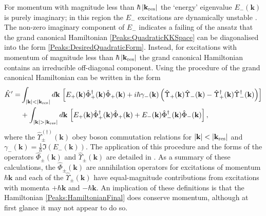 For momentum with magnitude less than $\hbar \left|\mathbf{k}_\text{res}\right|$ the `energy' eigenvalue $E_-(\mathbf{k})$ is purely imaginary; in this region the $E_-$ excitations are dynamically unstable \citep{Leonhardt:2003}. The non-zero imaginary component of $E_-$ indicates a failing of the ansatz that the grand canonical Hamiltonian \eqref{Peaks:QuadraticKKSpace} can be diagonalised into the form \eqref{Peaks:DesiredQuadraticForm}. Instead, for excitations with momentum of magnitude less than $\hbar\left|\mathbf{k}_\text{res}\right|$ the grand canonical Hamiltonian contains an irreducible off-diagonal component. Using the procedure of \citep{Leonhardt:2003} the grand canonical Hamiltonian can be written in the form
\begin{align}
    \begin{split}
        \hat{K}' =& \int_{\abs{\mathbf{k}}<\abs{\mathbf{k}_\text{res}}} d\mathbf{k}\, \left[ E_+(\mathbf{k}) \hat{\Phi}_+^\dagger(\mathbf{k})\hat{\Phi}_+(\mathbf{k}) + i \hbar \gamma_-(\mathbf{k}) \left( \hat{\Upsilon}_+(\mathbf{k}) \hat{\Upsilon}_-(\mathbf{k}) - \hat{\Upsilon}_+^\dagger(\mathbf{k}) \hat{\Upsilon}_-^\dagger(\mathbf{k})\right)\right] \\
        & + \int_{\abs{\mathbf{k}}>\abs{\mathbf{k}_\text{res}}} d\mathbf{k}\, \left[ E_+(\mathbf{k}) \hat{\Phi}_+^\dagger(\mathbf{k})\hat{\Phi}_+(\mathbf{k}) + E_-(\mathbf{k}) \hat{\Phi}_-^\dagger(\mathbf{k}) \hat{\Phi}_-(\mathbf{k})\right],
    \end{split}
    \label{Peaks:HamiltonianFinal}
\end{align}
where the $\hat{\Upsilon}_\pm^{(\dagger)}(\mathbf{k})$ obey boson commutation relations for $\left|\mathbf{k}\right| < \left|\mathbf{k}_\text{res}\right|$ and $\gamma_-(\mathbf{k}) = \frac{1}{\hbar}\Im(E_-(\mathbf{k}))$. The application of this procedure and the forms of the operators $\hat{\Phi}_\pm(\mathbf{k})$ and $\hat{\Upsilon}_\pm(\mathbf{k})$ are detailed in . As a summary of these calculations, the $\hat{\Phi}_\pm(\mathbf{k})$ are annihilation operators for excitations of momentum $\hbar\mathbf{k}$ and each of the $\hat{\Upsilon}_\pm(\mathbf{k})$ have equal-magnitude contributions from excitations with momenta $+\hbar\mathbf{k}$ and $-\hbar \mathbf{k}$. An implication of these definitions is that the Hamiltonian \eqref{Peaks:HamiltonianFinal} does conserve momentum, although at first glance it may not appear to do so.

